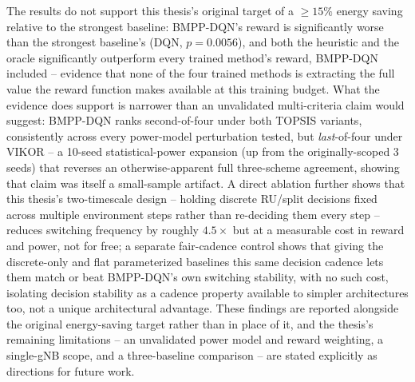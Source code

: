 The results do not support this thesis's original target of a
$\geq15\%$ energy saving relative to the strongest baseline: BMPP-DQN's
reward is significantly worse than the strongest baseline's (DQN,
$p=0.0056$), and both the heuristic and the oracle significantly
outperform every trained method's reward, BMPP-DQN included -- evidence
that none of the four trained methods is extracting the full value the
reward function makes available at this training budget. What the
evidence does support is narrower than an unvalidated multi-criteria
claim would suggest: BMPP-DQN ranks second-of-four under both TOPSIS
variants, consistently across every power-model perturbation tested, but
\emph{last}-of-four under VIKOR -- a 10-seed statistical-power expansion
(up from the originally-scoped 3 seeds) that reverses an
otherwise-apparent full three-scheme agreement, showing that claim was
itself a small-sample artifact. A direct ablation further shows that this
thesis's two-timescale design -- holding discrete RU/split decisions
fixed across multiple environment steps rather than re-deciding them
every step -- reduces switching frequency by roughly $4.5\times$ but at a
measurable cost in reward and power, not for free; a separate fair-cadence
control shows that giving the discrete-only and flat parameterized
baselines this same decision cadence lets them match or beat BMPP-DQN's
own switching stability, with no such cost, isolating decision stability
as a cadence property available to simpler architectures too, not a
unique architectural advantage. These findings are reported alongside the
original energy-saving target rather than in place of it, and the
thesis's remaining limitations -- an unvalidated power model and reward
weighting, a single-gNB scope, and a three-baseline comparison -- are
stated explicitly as directions for future work.
